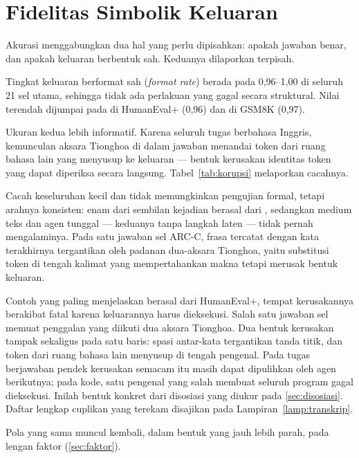 \section{Fidelitas Simbolik Keluaran}
\label{sec:fidelitas}

Akurasi menggabungkan dua hal yang perlu dipisahkan: apakah jawaban benar, dan
apakah keluaran berbentuk sah. Keduanya dilaporkan terpisah.

Tingkat keluaran berformat sah (\textit{format rate}) berada pada 0,96--1,00 di
seluruh 21 sel utama, sehingga tidak ada perlakuan yang gagal secara
struktural. Nilai terendah dijumpai pada  di HumanEval+ (0,96) dan
 di GSM8K (0,97).

Ukuran kedua lebih informatif. Karena seluruh tugas berbahasa Inggris,
kemunculan aksara Tionghoa di dalam jawaban menandai token dari ruang bahasa
lain yang menyusup ke keluaran --- bentuk kerusakan identitas token yang dapat
diperiksa secara langsung. Tabel~\ref{tab:korupsi} melaporkan cacahnya.



Cacah keseluruhan kecil dan tidak memungkinkan pengujian formal, tetapi arahnya
konsisten: enam dari sembilan kejadian berasal dari , sedangkan
medium teks dan agen tunggal --- keduanya tanpa langkah laten --- tidak pernah
mengalaminya. Pada satu jawaban sel  ARC-C, frasa  tercatat dengan kata terakhirnya tergantikan oleh padanan
dua-aksara Tionghoa, yaitu substitusi token di tengah kalimat yang
mempertahankan makna tetapi merusak bentuk keluaran.

Contoh yang paling menjelaskan berasal dari HumanEval+, tempat kerusakannya
berakibat fatal karena keluarannya harus dieksekusi. Salah satu jawaban sel
 memuat penggalan  yang diikuti dua
aksara Tionghoa. Dua bentuk kerusakan tampak sekaligus pada satu baris: spasi
antar-kata tergantikan tanda titik, dan token dari ruang bahasa lain menyusup
di tengah pengenal. Pada tugas berjawaban pendek kerusakan semacam itu masih
dapat dipulihkan oleh agen berikutnya; pada kode, satu pengenal yang salah
membuat seluruh program gagal dieksekusi. Inilah bentuk konkret dari disosiasi
yang diukur pada \ref{sec:disosiasi}. Daftar lengkap cuplikan yang terekam
disajikan pada Lampiran~\ref{lamp:transkrip}.

Pola yang sama muncul kembali, dalam bentuk yang jauh lebih parah, pada lengan
faktor (\ref{sec:faktor}).

